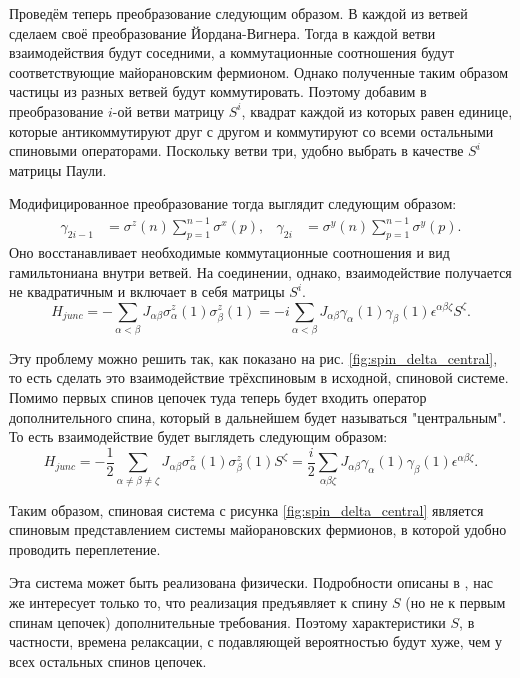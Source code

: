 \documentclass[a4paper,12pt]{article}
\theoremstyle{plain} %
\theoremstyle{definition} %
\theoremstyle{remark} %
\begin{document}
Проведём теперь преобразование следующим образом. В каждой из ветвей сделаем своё преобразование Йордана-Вигнера. Тогда в каждой ветви взаимодействия будут соседними, а коммутационные соотношения будут соответствующие майорановским фермионом. Однако полученные таким образом частицы из разных ветвей будут коммутировать. Поэтому добавим в преобразование $i$-ой ветви матрицу $S^i$, квадрат каждой из которых равен единице, которые антикоммутируют друг с другом и коммутируют со всеми остальными спиновыми операторами. Поскольку ветви три, удобно выбрать в качестве $S^i$ матрицы Паули.

Модифицированное преобразование тогда выглядит следующим образом:
\begin{align}
    \gamma_{2i-1} &= \sigma^z (n) \sum\limits_{p=1}^{n-1} \sigma^x (p), & 
    \gamma_{2i} &= \sigma^y (n) \sum\limits_{p=1}^{n-1} \sigma^y (p).
\end{align}
Оно восстанавливает необходимые коммутационные соотношения и вид гамильтониана внутри ветвей. На соединении, однако, взаимодействие получается не квадратичным и включает в себя матрицы $S^i$.
\begin{equation}
    H_{junc} = - \sum\limits_{\alpha < \beta} J_{\alpha \beta} \sigma_\alpha^z (1) \sigma_\beta^z (1) = - i \sum\limits_{\alpha < \beta} J_{\alpha \beta} \gamma_\alpha (1) \gamma_\beta (1) \epsilon^{\alpha \beta \zeta} S^\zeta.
\end{equation}

Эту проблему можно решить так, как показано на рис. \ref{fig:spin_delta_central}, то есть сделать это взаимодействие трёхспиновым в исходной, спиновой системе. Помимо первых спинов цепочек туда теперь будет входить оператор дополнительного спина, который в дальнейшем будет называться "центральным"$ $. То есть взаимодействие будет выглядеть следующим образом:
\begin{equation}
    H_{junc} = - \frac{1}{2} \sum\limits_{\alpha \neq \beta \neq \zeta} J_{\alpha \beta} \sigma_\alpha^z (1) \sigma_\beta^z (1) S^\zeta = \frac{i}{2} \sum\limits_{\alpha \beta \zeta} J_{\alpha \beta} \gamma_\alpha (1) \gamma_\beta (1) \epsilon^{\alpha \beta \zeta}.
\end{equation}

Таким образом, спиновая система с рисунка \ref{fig:spin_delta_central} является спиновым представлением системы майорановских фермионов, в которой удобно проводить переплетение.

Эта система может быть реализована физически. Подробности описаны в \cite{main}, нас же интересует только то, что реализация предъявляет к спину $S$ (но не к первым спинам цепочек) дополнительные требования. Поэтому характеристики $S$, в частности, времена релаксации, с подавляющей вероятностью будут хуже, чем у всех остальных спинов цепочек.

\pagebreak

\pagebreak



\end{document}
